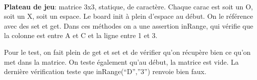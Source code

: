 \\\textbf{Plateau de jeu}: matrice 3x3, statique, de caractère. Chaque carac est soit un O, soit un X, soit un espace. Le board init à plein d’espace au début. On le référence avec des set et get.
Dans ces méthodes on a une assertion inRange, qui vérifie que la colonne est entre A et C et la ligne entre 1 et 3.

Pour le test, on fait plein de get et set et de vérifier qu’on récupère bien ce qu’on met dans la matrice. On teste également qu’au début, la matrice est vide. La dernière vérification teste que inRange(“D”,”3”) renvoie bien faux.